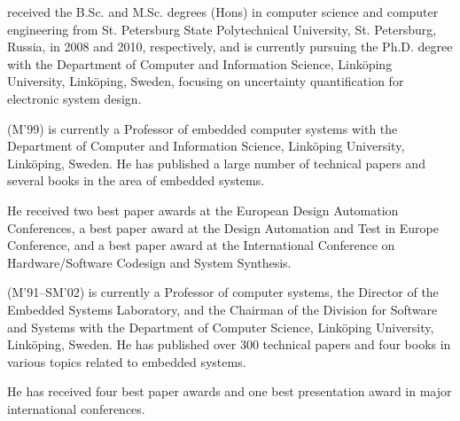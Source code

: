 \vspace{0.5em}
 received the B.Sc. and M.Sc. degrees (Hons) in
computer science and computer engineering from St. Petersburg State
Polytechnical University, St. Petersburg, Russia, in 2008 and 2010,
respectively, and is currently pursuing the Ph.D. degree with the Department of
Computer and Information Science, Link\"{o}ping University, Link\"{o}ping,
Sweden, focusing on uncertainty quantification for electronic system design.

\vspace{0.5em}
 (M'99) is currently a Professor of embedded computer
systems with the Department of Computer and Information Science, Link\"{o}ping
University, Link\"{o}ping, Sweden. He has published a large number of technical
papers and several books in the area of embedded systems.

He received two best paper awards at the European Design Automation Conferences,
a best paper award at the Design Automation and Test in Europe Conference, and a
best paper award at the International Conference on Hardware/Software Codesign
and System Synthesis.

\vspace{0.5em}
 (M'91--SM'02) is currently a Professor of computer
systems, the Director of the Embedded Systems Laboratory, and the Chairman of
the Division for Software and Systems with the Department of Computer Science,
Link\"{o}ping University, Link\"{o}ping, Sweden. He has published over 300
technical papers and four books in various topics related to embedded systems.

He has received four best paper awards and one best presentation award in major
international conferences.
